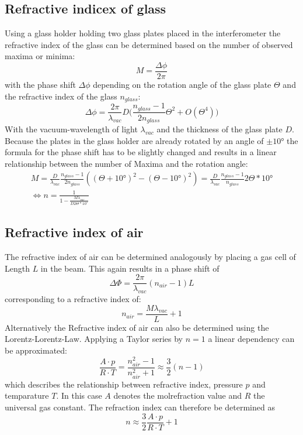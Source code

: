 \subsection{Refractive indicex of glass}
Using a glass holder holding two glass plates placed in the interferometer the refractive index of the glass can be determined based on the number of observed maxima or minima:
\begin{equation*}
M=\frac{\Delta \phi}{2\pi}
\end{equation*}
with the phase shift $\Delta \phi$ depending on the rotation angle of the glass plate $\Theta$ and the refractive index of the glass $n_{glass}$:
\begin{equation}
\Delta \phi=\frac{2\pi}{\lambda_{vac}}D\bigl( \frac{n_{glass}-1}{2n_{glass}}\Theta^2+O(\Theta^4)\bigr)
\end{equation}
With the vacuum-wavelength of light $\lambda_{vac}$ and the thickness of the glass plate $D$. Because the plates in the glass holder are already rotated by an angle of $\pm10°$ the formula for the phase shift has to be slightly changed and results in a linear relationship between the number of Maxima and the rotation angle:
\begin{gather}
M=\frac{D}{\lambda_{vac}}\frac{n_{glass}-1}{2n_{glass}}((\Theta+10°)^2-(\Theta-10°)^2)=\frac{D}{\lambda_{vac}}\frac{n_{glass}-1}{n_{glass}}2\Theta*10° \\
    \iff n=\frac{1}{1-\frac{M\lambda_{vac}}{D2\Theta*10°}}
    \label{eq:n}
\end{gather}
\subsection{Refractive index of air}
The refractive index of air can be determined analogously by placing a gas cell of Length $L$ in the beam. This again results in a phase shift of
\begin{equation*}
\Delta \Phi=\frac{2\pi}{\lambda_{vac}}(n_{air}-1)L
\end{equation*}
corresponding to a refractive index of:
\begin{equation}
    n_{air}=\frac{M\lambda_{vac}}{L}+1
    \label{eq:n_air}
\end{equation}
Alternatively the Refractive index of air can also be determined using the Lorentz-Lorentz-Law. Applying a Taylor series by $n = 1$ a linear dependency can be approximated:
\begin{equation}
    \frac{A \cdot p}{R \cdot T} = \frac{n_{air}^2-1}{n_{air}^2+1} \approx \frac{3}{2} (n - 1)
\end{equation}
which describes the relationship between refractive index, pressure $p$ and temparature $T$. In this case $A$ denotes the molrefraction value and $R$ the universal gas constant.
The refraction index can therefore be determined as
\begin{equation}
    n \approx \frac{3}{2} \frac{A \cdot p}{R \cdot T} + 1
    \label{eq:n_glas_taylor}
\end{equation}